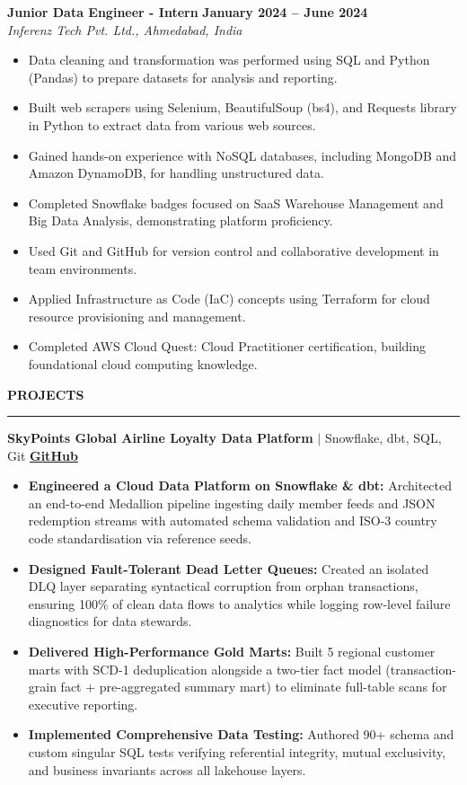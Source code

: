 \documentclass[11pt,a4paper]{article}
\begin{document}
\vspace{0.2cm}

\noindent\textbf{Junior Data Engineer - Intern} \hfill \textbf{January 2024 – June 2024} \\
\textit{Inferenz Tech Pvt. Ltd., Ahmedabad, India}
\begin{itemize}
  \item Data cleaning and transformation was performed using SQL and Python (Pandas) to prepare datasets for analysis and reporting.
  \item Built web scrapers using Selenium, BeautifulSoup (bs4), and Requests library in Python to extract data from various web sources.
  \item Gained hands-on experience with NoSQL databases, including MongoDB and Amazon DynamoDB, for handling unstructured data.
  \item Completed Snowflake badges focused on SaaS Warehouse Management and Big Data Analysis, demonstrating platform proficiency.
  \item Used Git and GitHub for version control and collaborative development in team environments.
  \item Applied Infrastructure as Code (IaC) concepts using Terraform for cloud resource provisioning and management.
  \item Completed AWS Cloud Quest: Cloud Practitioner certification, building foundational cloud computing knowledge.
\end{itemize}

\vspace{0.2cm}

\noindent\textbf{\large PROJECTS}
\vspace{0.1cm}
\hrule
\vspace{0.2cm}

\noindent\textbf{SkyPoints Global Airline Loyalty Data Platform} $|$ Snowflake, dbt, SQL, Git \hfill \href{https://github.com/Sumit-Thakkar/skypoints-loyalty-platform}{\textbf{GitHub}}
\begin{itemize}
  \item \textbf{Engineered a Cloud Data Platform on Snowflake \& dbt:} Architected an end-to-end Medallion pipeline ingesting daily member feeds and JSON redemption streams with automated schema validation and ISO-3 country code standardisation via reference seeds.
  \item \textbf{Designed Fault-Tolerant Dead Letter Queues:} Created an isolated DLQ layer separating syntactical corruption from orphan transactions, ensuring 100\% of clean data flows to analytics while logging row-level failure diagnostics for data stewards.
  \item \textbf{Delivered High-Performance Gold Marts:} Built 5 regional customer marts with SCD-1 deduplication alongside a two-tier fact model (transaction-grain fact + pre-aggregated summary mart) to eliminate full-table scans for executive reporting.
  \item \textbf{Implemented Comprehensive Data Testing:} Authored 90+ schema and custom singular SQL tests verifying referential integrity, mutual exclusivity, and business invariants across all lakehouse layers.
\end{itemize}
\end{document}
